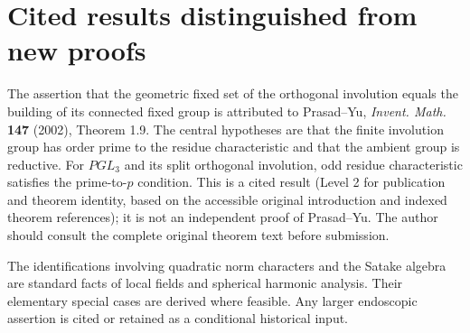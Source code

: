 \documentclass[12pt,letterpaper]{amsart}
\begin{document}
\section{Cited results distinguished from new proofs}
The assertion that the geometric fixed set of the orthogonal
involution equals the building of its connected fixed group is
attributed to Prasad--Yu, \emph{Invent. Math.} \textbf{147}
(2002), Theorem 1.9. The central hypotheses are that the finite
involution group has order prime to the residue characteristic and
that the ambient group is reductive. For $PGL_3$ and its split
orthogonal involution, odd residue characteristic satisfies the
prime-to-$p$ condition. This is a cited result (Level 2 for
publication and theorem identity, based on the accessible original
introduction and indexed theorem references); it is not an
independent proof of Prasad--Yu. The author should consult the
complete original theorem text before submission.

The identifications involving quadratic norm characters and the
Satake algebra are standard facts of local fields and spherical
harmonic analysis. Their elementary special cases are derived
where feasible. Any larger endoscopic assertion is cited or
retained as a conditional historical input.
\end{document}
